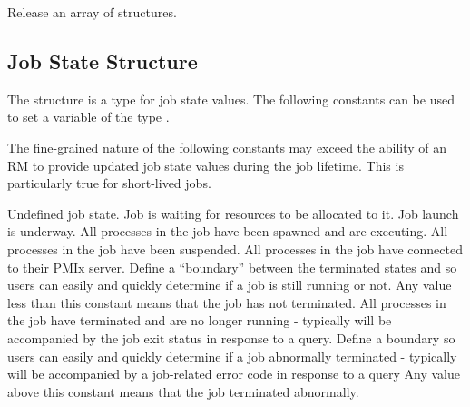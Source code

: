 
Release an array of  structures.


\begin{arglist}
\end{arglist}


\subsection{Job State Structure}
\label{api:struct:jobstate}

The  structure is a  type for job state values. The following constants can be used to set a variable of the type .

\adviceuserstart
The fine-grained nature of the following constants may exceed the ability of an \ac{RM} to provide updated job state values during the job lifetime. This is particularly true for short-lived jobs.
\adviceuserend

\begin{constantdesc}
%
Undefined job state.
%
Job is waiting for resources to be allocated to it.
%
Job launch is underway.
%
All processes in the job have been spawned and are executing.
%
All processes in the job have been suspended.
%
All processes in the job have connected to their \ac{PMIx} server.
%
Define a ``boundary'' between the terminated states and  so users can easily and quickly determine if a job is still running or not.
Any value less than this constant means that the job has not terminated.
%
All processes in the job have terminated and are no longer running - typically will be accompanied by the job exit status in response to a query.
%
Define a boundary so users can easily and quickly determine if a job abnormally terminated - typically will be accompanied by a job-related error code in response to a query
Any value above this constant means that the job terminated abnormally.
%
\end{constantdesc}


